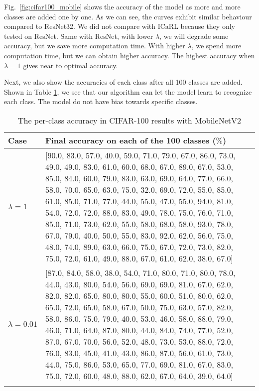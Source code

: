 Fig.~\ref{fig:cifar100_mobile} shows the accuracy of the model as more and more classes are added one by one. As we can see, the curves exhibit similar behaviour compared to ResNet32. We did not compare with ICaRL because they only tested on ResNet. Same with ResNet, with lower $\lambda$, we will degrade some accuracy, but we save more computation time. With higher $\lambda$, we spend more computation time, but we can obtain higher accuracy. The highest accuracy when $\lambda=1$ gives near to optimal accuracy.

Next, we also show the accuracies of each class after all 100 classes are added. Shown in Table \ref{tab:cifar100_mobile}, we see that our algorithm can let the model learn to recognize each class. The model do not have bias towards specific classes.
\begin{table}[!hpb]
	\centering
	\caption[The per-class accuracy in CIFAR-100 results with MobileNetV2]
	{The per-class accuracy in CIFAR-100 results with MobileNetV2}
	\label{tab:firstone}
	\begin{tabular}{@{}lp{10cm}@{}} \toprule
		Case &  Final accuracy on each of the 100 classes ($\%$)\\ \midrule
		$\lambda=1$  &[90.0, 83.0, 57.0, 40.0, 59.0, 71.0, 79.0, 67.0, 86.0, 73.0, 49.0, 49.0, 83.0, 61.0, 60.0, 68.0, 67.0, 89.0, 67.0, 53.0, 85.0, 84.0, 60.0, 79.0, 83.0, 63.0, 69.0, 64.0, 77.0, 66.0, 58.0, 70.0, 65.0, 63.0, 75.0, 32.0, 69.0, 72.0, 55.0, 85.0, 61.0, 85.0, 71.0, 77.0, 44.0, 55.0, 47.0, 55.0, 94.0, 81.0, 54.0, 72.0, 72.0, 88.0, 83.0, 49.0, 78.0, 75.0, 76.0, 71.0, 85.0, 71.0, 73.0, 62.0, 55.0, 58.0, 68.0, 58.0, 93.0, 78.0, 67.0, 79.0, 40.0, 50.0, 55.0, 83.0, 92.0, 62.0, 56.0, 75.0, 48.0, 74.0, 89.0, 63.0, 66.0, 75.0, 67.0, 72.0, 73.0, 82.0, 75.0, 72.0, 61.0, 49.0, 88.0, 67.0, 61.0, 62.0, 38.0, 67.0]
		
		\\
		$\lambda=0.01$  & [87.0, 84.0, 58.0, 38.0, 54.0, 71.0, 80.0, 71.0, 80.0, 78.0, 44.0, 43.0, 80.0, 54.0, 56.0, 69.0, 69.0, 81.0, 67.0, 62.0, 82.0, 82.0, 65.0, 80.0, 80.0, 55.0, 60.0, 51.0, 80.0, 62.0, 65.0, 72.0, 65.0, 58.0, 67.0, 50.0, 75.0, 63.0, 57.0, 82.0, 58.0, 86.0, 75.0, 79.0, 40.0, 53.0, 46.0, 58.0, 88.0, 79.0, 46.0, 71.0, 64.0, 87.0, 80.0, 44.0, 84.0, 74.0, 77.0, 52.0, 87.0, 67.0, 70.0, 56.0, 52.0, 48.0, 73.0, 53.0, 88.0, 72.0, 76.0, 83.0, 45.0, 41.0, 43.0, 86.0, 87.0, 56.0, 61.0, 73.0, 44.0, 75.0, 86.0, 53.0, 65.0, 77.0, 69.0, 81.0, 67.0, 83.0, 75.0, 72.0, 60.0, 48.0, 88.0, 62.0, 67.0, 64.0, 39.0, 64.0]
		
		\\ \bottomrule
		\label{tab:cifar100_mobile}
	\end{tabular}
\end{table}
